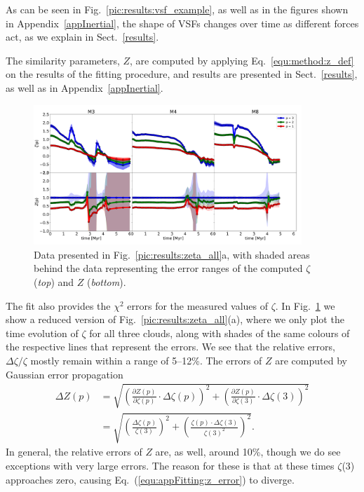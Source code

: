 As can be seen in Fig.~\ref{pic:results:vsf_example}, as well as in the figures shown in Appendix~\ref{appInertial}, the shape of VSFs changes over time as different forces act, as we explain in Sect.~\ref{results}. 

The similarity parameters, $Z$, are computed by applying Eq.~\ref{equ:method:z_def} on the results of the fitting procedure, and results are presented in Sect.~\ref{results}, as well as in Appendix~\ref{appInertial}.


\begin{figure}
\centering
\includegraphics[width=0.9\textwidth]{error_vsf04_zeta_z.pdf}
\caption{
    Data presented in Fig.~\ref{pic:results:zeta_all}a, with
    shaded areas behind the data representing the error ranges of the computed $\zeta$ (\textit{top}) and $Z$ (\textit{bottom}).
}
\label{pic:appFitting:error_vsfhr04_zeta_z}
\end{figure}


The fit also provides the $\chi^2$ errors for the measured values of $\zeta$. 
In Fig.~\ref{pic:appFitting:error_vsfhr04_zeta_z} we show a reduced version of Fig.~\ref{pic:results:zeta_all}(a), where we only plot the time evolution of $\zeta$ for all three clouds, along with shades of the same colours of the respective lines that represent the errors.
We see that the relative errors, $\Delta \zeta / \zeta$ mostly remain within a range of 5--12\%. 
The errors of $Z$ are computed by Gaussian error propagation
\begin{align}\Delta Z(p) &= \sqrt{ \left( \frac{\partial Z(p)}{\partial \zeta(p)} \cdot \Delta\zeta(p) \right)^2 + \left( \frac{\partial Z(p)}{\partial \zeta(3)} \cdot \Delta\zeta(3) \right)^2 } \\
    &= \sqrt{ \left( \frac{\Delta\zeta(p)}{\zeta(3)} \right)^2 + \left( \frac{ \zeta(p) \cdot \Delta\zeta(3)}{\zeta(3)^2} \right)^2 }.
    \label{equ:appFitting:z_error}
\end{align}
\noindent In general, the relative errors of $Z$ are, as well, around 10\%, though we do see exceptions with very large errors. 
The reason for these is that at these times $\zeta$(3) approaches zero, causing Eq.~(\ref{equ:appFitting:z_error}) to diverge.



\endinput
